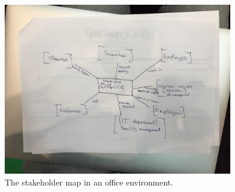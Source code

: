 \documentclass[english]{tktltiki}
\begin{document}
	\begin{figure}[h] 
		\begin{center}
			\includegraphics[width=0.9\textwidth]{images/stakeholdermap.jpg}
			\caption{The stakeholder map in an office environment.}
			\label{stakeholder_map}
		\end{center}
	\end{figure}
\end{document}
